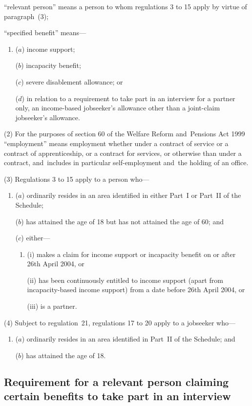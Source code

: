 \documentclass[12pt,a4paper]{article}
\begin{document}
\begin{enumerate}
“relevant person” means a person to whom regulations 3 to 15 apply by virtue of paragraph~(3);

“specified benefit” means—
\begin{enumerate}\item[]
($a$) 
income support;

($b$) 
incapacity benefit;

($c$) 
severe disablement allowance; or

($d$) 
in relation to a requirement to take part in an interview for a partner only, an income-based jobseeker’s allowance other than a joint-claim jobseeker’s allowance.
\end{enumerate}
\end{enumerate}

(2) For the purposes of section 60 of the Welfare Reform and~Pensions Act 1999 “employment” means employment whether under a contract of service or a contract of apprenticeship, or a contract for services, or otherwise than under a contract, and~includes in particular self-employment and~the holding of an office.

(3) Regulations 3 to 15 apply to a person who—
\begin{enumerate}\item[]
($a$) ordinarily resides in an area identified in either Part~I or Part~II of the Schedule;

($b$) has attained the age of 18 but has not attained the age of 60; and

($c$) either—
\begin{enumerate}\item[]
(i) makes a claim for income support or incapacity benefit on or after 26th April 2004, or

(ii) has been continuously entitled to income support (apart from incapacity-based income support) from a date before 26th April 2004, or

(iii) is a partner.
\end{enumerate}
\end{enumerate}

(4) Subject to regulation~21, regulations 17 to 20 apply to a jobseeker who—
\begin{enumerate}\item[]
($a$) ordinarily resides in an area identified in Part~II of the Schedule; and

($b$) has attained the age of 18.
\end{enumerate}

\subsection[3. Requirement for a relevant person claiming certain benefits to take part in an interview]{Requirement for a relevant person claiming certain benefits to take part in an interview}
\end{document}
